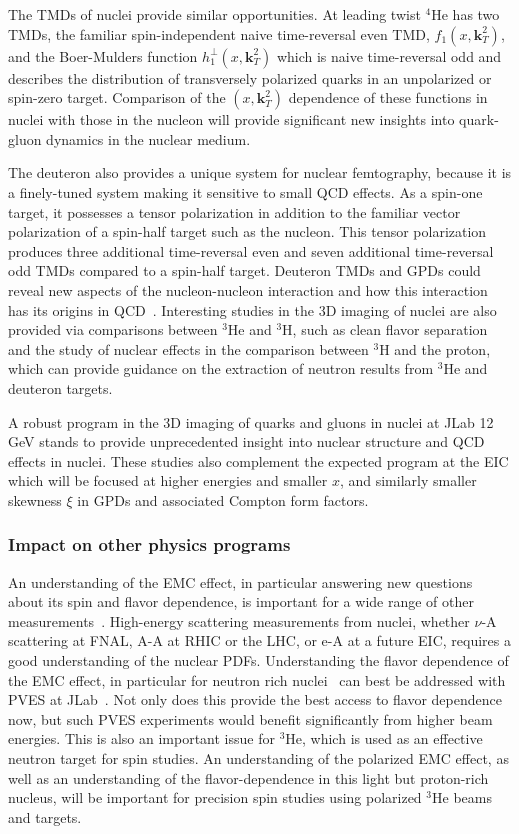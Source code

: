 The TMDs of nuclei provide similar opportunities. At leading twist $^4$He has two TMDs, the familiar spin-independent naive time-reversal even TMD, $f_1(x,\boldsymbol{k}_T^2)$, and the Boer-Mulders function $h_1^\perp(x,\boldsymbol{k}_T^2)$ which is naive time-reversal odd and describes the distribution of transversely polarized quarks in an unpolarized or spin-zero target. Comparison of the $(x,\boldsymbol{k}_T^2)$ dependence of these functions in nuclei with those in the nucleon will provide significant new insights into quark-gluon dynamics in the nuclear medium. 

The deuteron also provides a unique system for nuclear femtography, because it is a finely-tuned system making it sensitive to small QCD effects. As a spin-one target, it possesses a tensor polarization in addition to the familiar vector polarization of a spin-half target such as the nucleon. This tensor polarization produces three additional time-reversal even and seven additional time-reversal odd TMDs compared to a spin-half target. Deuteron TMDs and GPDs could reveal new aspects of the nucleon-nucleon interaction and how this interaction has its origins in QCD~\cite{Ninomiya:2017ggn}. Interesting studies in the 3D imaging of nuclei are also provided via comparisons between $^3$He and $^3$H, such as clean flavor separation and the study of nuclear effects in the comparison between $^3$H and the proton, which can provide guidance on the extraction of neutron results from $^3$He and deuteron targets.

A robust program in the 3D imaging of quarks and gluons in nuclei at JLab 12\,GeV stands to provide unprecedented insight into nuclear structure and QCD effects in nuclei. These studies also complement the expected program at the EIC which will be focused at higher energies and smaller $x$, and similarly smaller skewness $\xi$ in GPDs and associated Compton form factors. 


\subsubsection{Impact on other physics programs}

An understanding of the EMC effect, in particular answering new questions about its spin and flavor dependence, is important for a wide range of other measurements~\cite{Cloet:2019mql}. High-energy scattering measurements from nuclei, whether $\nu$-A scattering at FNAL, A-A at RHIC or the LHC, or e-A at a future EIC, requires a good understanding of the nuclear PDFs. Understanding the flavor dependence of the EMC effect, in particular for neutron rich nuclei~\cite{Arrington:2012ax, Arrington:2015wja, CLAS:2019vsb, Arrington:2019wky} can best be addressed with PVES at JLab~\cite{Cloet:2019mql,PVEMC}. Not only does this provide the best access to flavor dependence now, but such PVES experiments would benefit significantly from higher beam energies. This is also an important issue for $^3$He, which is used as an effective neutron target for spin studies. An understanding of the polarized EMC effect, as well as an understanding of the flavor-dependence in this light but proton-rich nucleus, will be important for precision spin studies using polarized $^3$He beams and targets.



